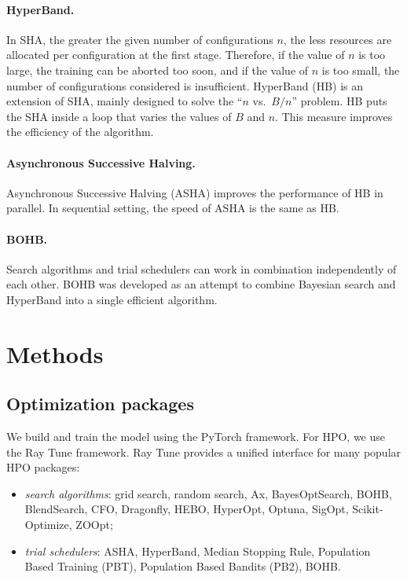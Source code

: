 \documentclass[reprint,
superscriptaddress,
amsmath,amssymb,aps,showkeys,showpacs,
twoside,final,secnumarabic,%
nofootinbib]{revtex4-2}
\begin{document}
\paragraph*{HyperBand.}
In SHA, the greater the given number of configurations $n$, the less resources are allocated per configuration at the first stage. Therefore, if the value of $n$ is too large, the training can be aborted too soon, and if the value of $n$ is too small, the number of configurations considered is insufficient. HyperBand (HB) \cite{bib25} is an extension of SHA, mainly designed to solve the “$n$ vs.\ $B/n$” problem. HB puts the SHA inside a loop that varies the values of $B$ and $n$. This measure improves the efficiency of the algorithm.

\paragraph*{Asynchronous Successive Halving.}
Asynchronous Successive Halving (ASHA) \cite{bib26} improves the performance of HB in parallel. In sequential setting, the speed of ASHA is the same as HB.

\paragraph*{BOHB.}
Search algorithms and trial schedulers can work in combination independently of each other. BOHB \cite{bib27} was developed as an attempt to combine Bayesian search and HyperBand into a single efficient algorithm.

\section{Methods}

\subsection{Optimization packages}
We build and train the model using the PyTorch framework. For HPO, we use the Ray Tune framework. Ray Tune provides a unified interface for many popular HPO packages:
\begin{itemize}
\item \textit{search algorithms}: grid search, random search, Ax, BayesOptSearch, BOHB, BlendSearch, CFO, Dragonfly, HEBO, HyperOpt, Optuna, SigOpt, Scikit-Optimize, ZOOpt;
\item \textit{trial schedulers}: ASHA, HyperBand, Median Stopping Rule, Population Based Training (PBT), Population Based Bandits (PB2), BOHB.
\end{itemize}
\end{document}
